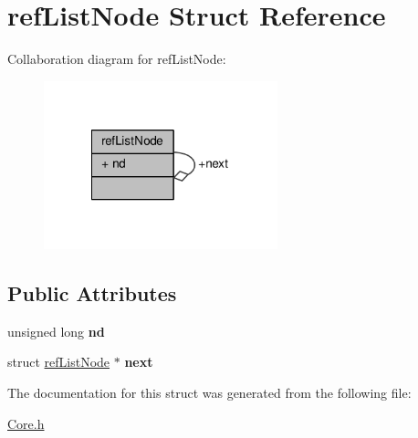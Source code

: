 \hypertarget{structrefListNode}{\section{ref\-List\-Node Struct Reference}
\label{structrefListNode}
}


Collaboration diagram for ref\-List\-Node\-:
\nopagebreak
\begin{figure}[H]
\begin{center}
\leavevmode
\includegraphics[width=192pt]{structrefListNode__coll__graph}
\end{center}
\end{figure}
\subsection*{Public Attributes}
\begin{DoxyCompactItemize}
\item 
\hypertarget{structrefListNode_aad950dd70f5d0b14f39b1f67dfc01580}{unsigned long {\bfseries nd}}\label{structrefListNode_aad950dd70f5d0b14f39b1f67dfc01580}

\item 
\hypertarget{structrefListNode_abc7e153a5f4c6f5652cecd19da99cbce}{struct \hyperlink{structrefListNode}{ref\-List\-Node} $\ast$ {\bfseries next}}\label{structrefListNode_abc7e153a5f4c6f5652cecd19da99cbce}

\end{DoxyCompactItemize}


The documentation for this struct was generated from the following file\-:\begin{DoxyCompactItemize}
\item 
\hyperlink{Core_8h}{Core.\-h}\end{DoxyCompactItemize}

